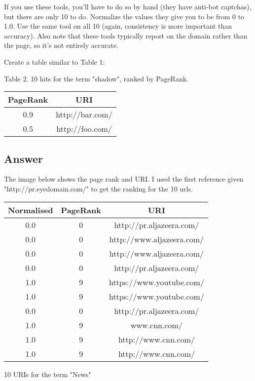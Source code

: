 \documentclass[letterpaper,12pt]{article}
\begin{document}
If you use these tools, you'll have to do so by hand (they have anti-bot captchas), but there are only 10 to do. Normalize the values they give you to be from 0 to 1.0. Use the same tool on all 10 (again, consistency is more important than accuracy). Also note that these tools typically report on the domain rather than the page, so it's not entirely accurate.

Create a table similar to Table 1:

Table 2. 10 hits for the term "shadow", ranked by PageRank.

\begin{center}
 \begin{tabular}{||c c||} 
 \hline
 PageRank & URI \\ [0.5ex] 
 \hline\hline
 0.9 & http://bar.com/ \\ 
 \hline
 0.5 & http://foo.com/ \\
 \hline
\end{tabular}
\end{center}

\subsection{Answer}
\vspace{2mm}
The image below shows the page rank and URI. I used the first reference given "http://pr.eyedomain.com/" to get the ranking for the 10 urls.


\begin{center}
 \begin{tabular}{||c c||c||} 
 \hline
 Normalised & PageRank & URI \\ [0.5ex] 
 \hline\hline
 0.0 & 0 & http://pr.aljazeera.com/ \\ 
 \hline
 0.0 & 0 & http://www.aljazeera.com/ \\
 \hline
  0.0 & 0 & http://www.aljazeera.com/ \\
 \hline
   0.0 & 0 & http://pr.aljazeera.com/\\
 \hline
  1.0 & 9 & https://www.youtube.com/ \\
 \hline
   1.0 & 9 & https://www.youtube.com/ \\
 \hline
   0.0 & 0 & http://pr.aljazeera.com/ \\
 \hline
  1.0 & 9 & www.cnn.com/ \\
 \hline
 1.0 & 9 & http://www.cnn.com/ \\
 \hline
 1.0 & 9 & http://www.cnn.com/ \\
 \hline
\end{tabular}
\end{center}
\caption{10 URIs for the term "News"}
\end{document}
